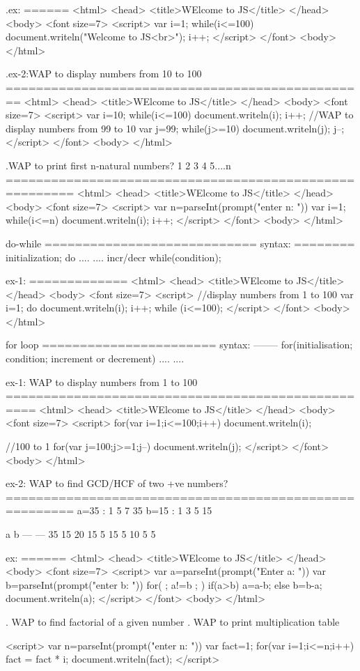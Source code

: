 .ex:
======
<html>
  <head>
   <title>WElcome to JS</title>
  </head>
  <body>
    <font size=7>
     <script>
	    var i=1;
		while(i<=100)
		{
			document.writeln("Welcome to JS<br>");
			i++;
		}
	</script>
   </font>
  <body>
</html>

.ex-2:WAP to display numbers from 10 to 100
================================================
<html>
  <head>
   <title>WElcome to JS</title>
  </head>
  <body>
    <font size=7>
     <script>
	    var i=10;
		while(i<=100)
		{
			document.writeln(i);
			i++;
		}
		//WAP to display numbers from 99 to 10
		var j=99;
		while(j>=10)
		{
			document.writeln(j);
			j--;
		}
	</script>
   </font>
  <body>
</html>

.WAP to print first n-natural numbers?
   1 2 3 4 5....n
=======================================================
<html>
  <head>
   <title>WElcome to JS</title>
  </head>
  <body>
    <font size=7>
     <script>
	    var n=parseInt(prompt("enter n: "))
		var i=1;
		while(i<=n)
		{
			 document.writeln(i);
			 i++;
		}
	</script>
   </font>
  <body>
</html>

do-while
============================
syntax:
========
initialization;
do
{
  ....
  ....
  incr/decr
}while(condition);

ex-1:
=============
<html>
  <head>
   <title>WElcome to JS</title>
  </head>
  <body>
    <font size=7>
     <script>
	    //display numbers from 1 to 100
		var i=1;
		do
		{
			document.writeln(i);
			i++;
		}while (i<=100);
	</script>
   </font>
  <body>
</html>

for loop
=======================
syntax:
--------
for(initialisation; condition; increment or decrement)
{
 ....
 ....
}

ex-1: WAP to display numbers from 1 to 100
==================================================
<html>
  <head>
   <title>WElcome to JS</title>
  </head>
  <body>
    <font size=7>
     <script>
	    for(var i=1;i<=100;i++)
		{
			document.writeln(i);
		}

		//100 to 1
		for(var j=100;j>=1;j--)
		   document.writeln(j);
	</script>
   </font>
  <body>
</html>

ex-2: WAP to find GCD/HCF of two +ve numbers?
=======================================================
a=35 : 1 5 7 35
b=15 : 1 3 5 15

a	b
---	---
35	15 
20	15
5	15
5	10
5	5

ex:
======
<html>
  <head>
   <title>WElcome to JS</title>
  </head>
  <body>
    <font size=7>
     <script>
	   var a=parseInt(prompt("Enter a: "))
	   var b=parseInt(prompt("enter b: "))
	   for( ; a!=b ; )
	   {
		   if(a>b)
		     a=a-b;
		   else
		     b=b-a;
	   }
	   document.writeln(a);
	</script>
   </font>
  <body>
</html>

. WAP to find factorial of a given number
. WAP to print multiplication table

<script>
  var n=parseInt(prompt("enter n: "))
  var fact=1;
  for(var i=1;i<=n;i++)
  {
    fact = fact * i;
  }
  document.writeln(fact);
</script>